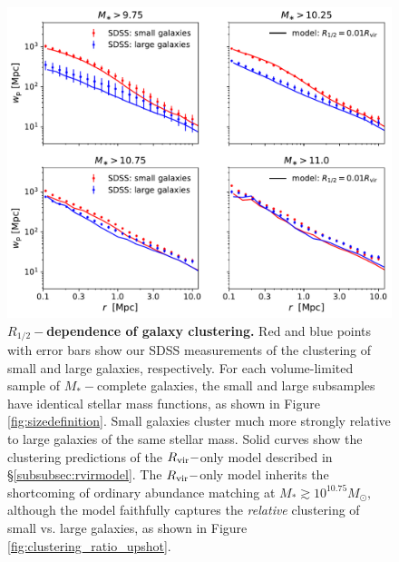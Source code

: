 \documentclass[usenatbib,usegraphicx,letterpaper]{mn2e}
\newcommand{\rhalf}{R_{1/2}}
\newcommand{\mstar}{M_{\ast}}
\newcommand{\rvir}{R_{\rm vir}}
\newcommand{\msun}{M_\odot}
\begin{document}
\begin{figure}
\centering
\includegraphics[width=12cm]{FIGS/rvir_only_wp_large_small_absolute.pdf}
\caption{
{\bf $\rhalf-$dependence of galaxy clustering.}
Red and blue points with error bars show our SDSS measurements of the clustering of small and large galaxies, respectively. For each volume-limited sample of $\mstar-$complete galaxies, the small and large subsamples have identical stellar mass functions, as shown in Figure \ref{fig:sizedefinition}. Small galaxies cluster much more strongly relative to large galaxies of the same stellar mass. Solid curves show the clustering predictions of the $\rvir-$only model described in \S\ref{subsubsec:rvirmodel}. The $\rvir-$only model inherits the shortcoming of ordinary abundance matching at $\mstar\gtrsim10^{10.75}\msun,$ although the model faithfully captures the {\em relative} clustering of small vs. large galaxies, as shown in Figure \ref{fig:clustering_ratio_upshot}. 
}
\label{fig:rvir_only_clustering_absolute}
\end{figure}
\end{document}
